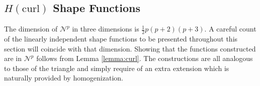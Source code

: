 %
%
%
%
%

\subsection{\texorpdfstring{$H(\mathrm{curl})$}{Hcurl} Shape Functions}


The dimension of $\mathcal{N}^p$ in three dimensions is $\frac{1}{2}p(p+2)(p+3)$.
A careful count of the linearly independent shape functions to be presented throughout this section will coincide with that dimension. 
Showing that the functions constructed are in $\mathcal{N}^p$ follows from Lemma \ref{lemma:curl}.
The constructions are all analogous to those of the triangle and simply require of an extra extension which is naturally provided by homogenization.

